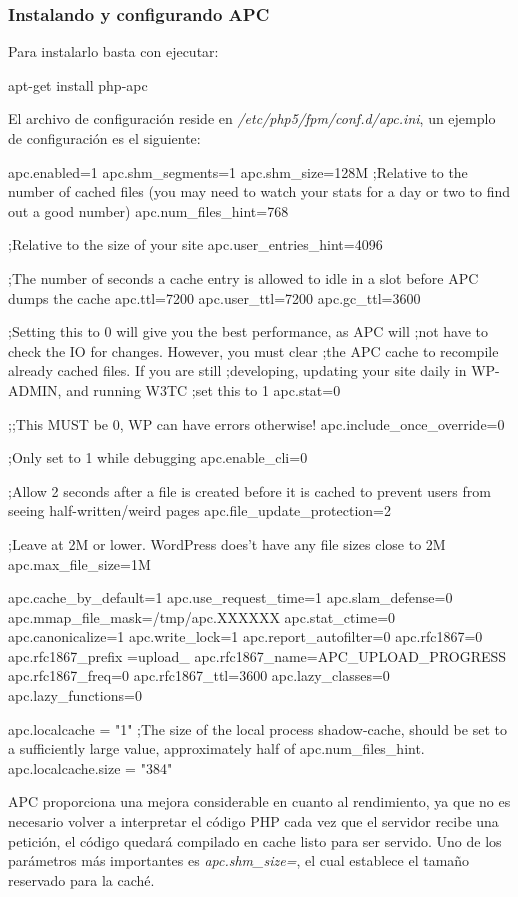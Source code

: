 \subsubsection{Instalando y configurando APC}
Para instalarlo basta con ejecutar:
\begin{bashcode}
apt-get install php-apc
\end{bashcode}
El archivo de configuración reside en \emph{/etc/php5/fpm/conf.d/apc.ini}, un ejemplo de
configuración es el siguiente:
\begin{bashcode}
apc.enabled=1
apc.shm_segments=1
apc.shm_size=128M
;Relative to the number of cached files (you may need to watch your stats for a day or two to find out a good number)
apc.num_files_hint=768

;Relative to the size of your site
apc.user_entries_hint=4096

;The number of seconds a cache entry is allowed to idle in a slot before APC dumps the cache
apc.ttl=7200
apc.user_ttl=7200
apc.gc_ttl=3600

;Setting this to 0 will give you the best performance, as APC will
;not have to check the IO for changes. However, you must clear
;the APC cache to recompile already cached files. If you are still
;developing, updating your site daily in WP-ADMIN, and running W3TC
;set this to 1
apc.stat=0

;;This MUST be 0, WP can have errors otherwise!
apc.include_once_override=0

;Only set to 1 while debugging
apc.enable_cli=0

;Allow 2 seconds after a file is created before it is cached to prevent users from seeing half-written/weird pages
apc.file_update_protection=2

;Leave at 2M or lower. WordPress does't have any file sizes close to 2M
apc.max_file_size=1M

apc.cache_by_default=1
apc.use_request_time=1
apc.slam_defense=0
apc.mmap_file_mask=/tmp/apc.XXXXXX
apc.stat_ctime=0
apc.canonicalize=1
apc.write_lock=1
apc.report_autofilter=0
apc.rfc1867=0
apc.rfc1867_prefix =upload_
apc.rfc1867_name=APC_UPLOAD_PROGRESS
apc.rfc1867_freq=0
apc.rfc1867_ttl=3600
apc.lazy_classes=0
apc.lazy_functions=0

apc.localcache = "1"
;The size of the local process shadow-cache, should be set to a sufficiently large value, approximately half of apc.num_files_hint.
apc.localcache.size = "384"
\end{bashcode}

APC proporciona una mejora considerable en cuanto al rendimiento, ya que
no es necesario volver a interpretar el código PHP cada vez que el servidor
recibe una petición, el código quedará compilado en cache listo para ser
servido. Uno de los parámetros más importantes es \emph{apc.shm\_size=},
el cual establece el tamaño reservado para la caché.
